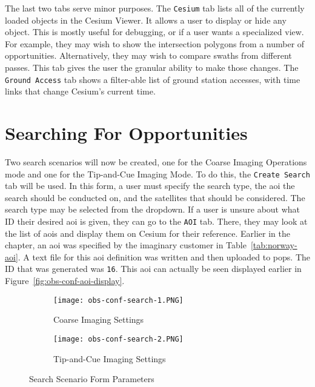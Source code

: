 The last two tabs serve minor purposes. The \texttt{Cesium} tab lists all of
the currently loaded objects in the Cesium Viewer. It allows a user to display
or hide any object. This is mostly useful for debugging, or if a user wants a
specialized view. For example, they may wish to show the intersection polygons
from a number of opportunities. Alternatively, they may wish to compare swaths
from different passes. This tab gives the user the granular ability to make
those changes. The \texttt{Ground Access} tab shows a filter-able list of
ground station accesses, with time links that change Cesium's current time.


\section{Searching For Opportunities}

Two search scenarios will now be created, one for the Coarse Imaging Operations
mode and one for the Tip-and-Cue Imaging Mode. To do this, the \texttt{Create
Search} tab will be used. In this form, a user must specify the search type,
the \gls{aoi} the search should be conducted on, and the  satellites that
should be considered.  The search type may be selected from the dropdown. If a
user is unsure about what ID their desired \gls{aoi} is given, they can go to
the \texttt{AOI} tab.  There, they may look at the list of \glspl{aoi} and
display them on Cesium for their reference. Earlier in the chapter, an
\gls{aoi} was specified by the imaginary customer in
Table~\ref{tab:norway-aoi}. A text file for this \gls{aoi} definition was
written and then uploaded to \gls{pops}. The ID that was generated was
\texttt{16}. This \gls{aoi} can actually be seen displayed earlier in
Figure~\ref{fig:obs-conf-aoi-display}.

\begin{figure}[h]
    \centering
    \begin{subfigure}[b]{0.49\textwidth}
	\centering
	\texttt{[image: obs-conf-search-1.PNG]} 
	\caption{Coarse Imaging Settings}
	\label{fig:obs-conf-search-1} 
    \end{subfigure}
    \hfill
    \begin{subfigure}[b]{0.49\textwidth}
	\centering
	\texttt{[image: obs-conf-search-2.PNG]} 
	\caption{Tip-and-Cue Imaging Settings}
	\label{fig:obs-conf-search-2} 
    \end{subfigure}
    \caption{Search Scenario Form Parameters}
    \label{fig:obs-conf-searches} 
\end{figure}


